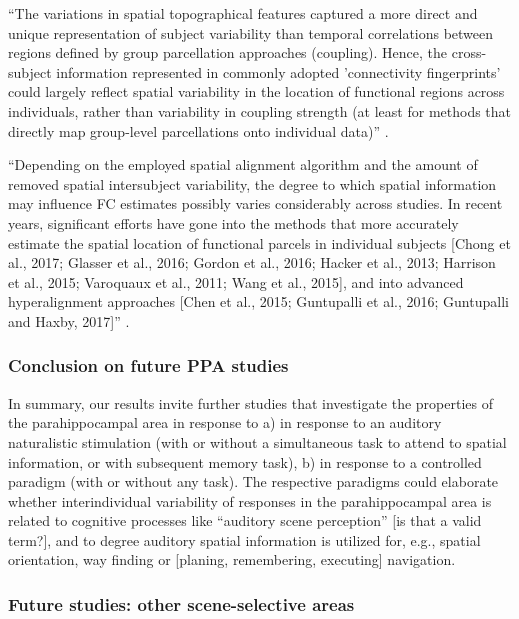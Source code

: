 %
``The variations in spatial topographical features captured a more direct and
unique representation of subject variability than temporal correlations between
regions defined by group parcellation approaches (coupling).
%
Hence, the cross-subject information represented in commonly adopted
'connectivity fingerprints' could largely reflect spatial variability in the
location of functional regions across individuals, rather than variability in
coupling strength (at least for methods that directly map group-level
parcellations onto individual data)'' \citep{bijsterbosch2018relationship}.

%
``Depending on the employed spatial alignment algorithm and the amount of
removed spatial intersubject variability, the degree to which spatial
information may influence FC estimates possibly varies considerably across
studies.
%
In recent years, significant efforts have gone into the methods that more
accurately estimate the spatial location of functional parcels in individual
subjects [Chong et al., 2017; Glasser et al., 2016; Gordon et al., 2016; Hacker
et al., 2013; Harrison et al., 2015; Varoquaux et al., 2011; Wang et al., 2015],
and into advanced hyperalignment approaches [Chen et al., 2015; Guntupalli et
al., 2016; Guntupalli and Haxby, 2017]'' \citep{bijsterbosch2018relationship}.


\subsubsection{Conclusion on future PPA studies}

%
In summary, our results invite further studies that investigate the properties
of the parahippocampal area in response to
%
a) in response to an auditory naturalistic stimulation (with or without a
simultaneous task to attend to spatial information, or with subsequent memory
task),
%
b) in response to a controlled paradigm (with or without any task).
%
The respective paradigms could elaborate whether interindividual variability of
responses in the parahippocampal area is related to cognitive processes like
``auditory scene perception'' [is that a valid term?], and to degree auditory
spatial information is utilized for, e.g., spatial orientation, way finding or
[planing, remembering, executing] navigation.


\subsubsection{Future studies: other scene-selective areas}

